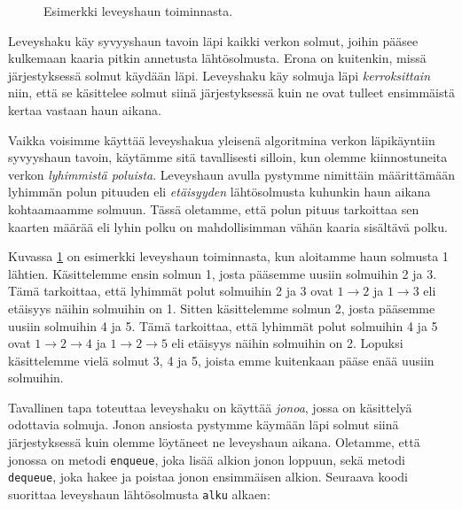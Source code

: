 \begin{figure}
\begin{center}
\end{center}
\caption{Esimerkki leveyshaun toiminnasta.}
\label{fig:levhak}
\end{figure}

Leveyshaku käy syvyyshaun tavoin läpi kaikki verkon solmut,
joihin pääsee kulkemaan kaaria pitkin annetusta lähtösolmusta.
Erona on kuitenkin, missä järjestyksessä solmut käydään läpi.
Leveyshaku käy solmuja läpi \emph{kerroksittain} niin,
että se käsittelee solmut siinä järjestyksessä kuin ne
ovat tulleet ensimmäistä kertaa vastaan haun aikana.

Vaikka voisimme käyttää leveyshakua yleisenä
algoritmina verkon läpi\-käyntiin syvyyshaun tavoin,
käytämme sitä tavallisesti silloin,
kun olemme kiinnostuneita verkon \emph{lyhimmistä poluista}.
Leveyshaun avulla pystymme nimittäin määrit\-tämään
lyhimmän polun pituuden eli \emph{etäisyyden} lähtösolmusta
kuhunkin haun aikana kohtaamaamme solmuun.
Tässä oletamme, että polun pituus tarkoittaa sen
kaarten määrää eli lyhin polku on mahdollisimman vähän
kaaria sisältävä polku.

Kuvassa \ref{fig:levhak} on esimerkki leveyshaun toiminnasta,
kun aloitamme haun solmusta 1 lähtien.
Käsittelemme ensin solmun 1, josta pääsemme uusiin solmuihin 2 ja 3.
Tämä tarkoittaa, että lyhimmät polut solmuihin 2 ja 3
ovat $1 \rightarrow 2$ ja $1 \rightarrow 3$ eli etäisyys näihin solmuihin on 1.
Sitten käsittelemme solmun 2, josta pääsemme uusiin solmuihin 4 ja 5.
Tämä tarkoittaa, että lyhimmät polut solmuihin 4 ja 5
ovat $1 \rightarrow 2 \rightarrow 4$ ja $1 \rightarrow 2 \rightarrow 5$
eli etäisyys näihin solmuihin on 2.
Lopuksi käsittelemme vielä solmut 3, 4 ja 5,
joista emme kuitenkaan pääse enää uusiin solmuihin.

Tavallinen tapa toteuttaa leveyshaku on käyttää \emph{jonoa},
jossa on käsittelyä odottavia solmuja.
Jonon ansiosta pystymme käymään läpi solmut siinä
jär\-jestyksessä kuin olemme löytäneet ne leveyshaun aikana.
Oletamme, että jonossa on metodi \texttt{enqueue},
joka lisää alkion jonon loppuun, sekä metodi \texttt{dequeue},
joka hakee ja poistaa jonon ensimmäisen alkion.
Seuraava koodi suorittaa leveyshaun lähtösolmusta \texttt{alku} alkaen:

